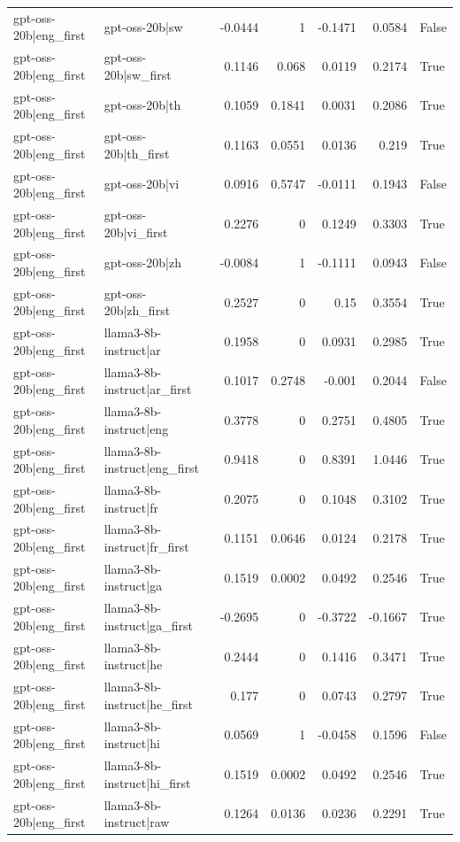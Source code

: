 \begin{table}
\begin{tabular}{l l r r r r l}
gpt-oss-20b|eng_first & gpt-oss-20b|sw & -0.0444 & 1 & -0.1471 & 0.0584 & False \\
gpt-oss-20b|eng_first & gpt-oss-20b|sw_first & 0.1146 & 0.068 & 0.0119 & 0.2174 & True \\
gpt-oss-20b|eng_first & gpt-oss-20b|th & 0.1059 & 0.1841 & 0.0031 & 0.2086 & True \\
gpt-oss-20b|eng_first & gpt-oss-20b|th_first & 0.1163 & 0.0551 & 0.0136 & 0.219 & True \\
gpt-oss-20b|eng_first & gpt-oss-20b|vi & 0.0916 & 0.5747 & -0.0111 & 0.1943 & False \\
gpt-oss-20b|eng_first & gpt-oss-20b|vi_first & 0.2276 & 0 & 0.1249 & 0.3303 & True \\
gpt-oss-20b|eng_first & gpt-oss-20b|zh & -0.0084 & 1 & -0.1111 & 0.0943 & False \\
gpt-oss-20b|eng_first & gpt-oss-20b|zh_first & 0.2527 & 0 & 0.15 & 0.3554 & True \\
gpt-oss-20b|eng_first & llama3-8b-instruct|ar & 0.1958 & 0 & 0.0931 & 0.2985 & True \\
gpt-oss-20b|eng_first & llama3-8b-instruct|ar_first & 0.1017 & 0.2748 & -0.001 & 0.2044 & False \\
gpt-oss-20b|eng_first & llama3-8b-instruct|eng & 0.3778 & 0 & 0.2751 & 0.4805 & True \\
gpt-oss-20b|eng_first & llama3-8b-instruct|eng_first & 0.9418 & 0 & 0.8391 & 1.0446 & True \\
gpt-oss-20b|eng_first & llama3-8b-instruct|fr & 0.2075 & 0 & 0.1048 & 0.3102 & True \\
gpt-oss-20b|eng_first & llama3-8b-instruct|fr_first & 0.1151 & 0.0646 & 0.0124 & 0.2178 & True \\
gpt-oss-20b|eng_first & llama3-8b-instruct|ga & 0.1519 & 0.0002 & 0.0492 & 0.2546 & True \\
gpt-oss-20b|eng_first & llama3-8b-instruct|ga_first & -0.2695 & 0 & -0.3722 & -0.1667 & True \\
gpt-oss-20b|eng_first & llama3-8b-instruct|he & 0.2444 & 0 & 0.1416 & 0.3471 & True \\
gpt-oss-20b|eng_first & llama3-8b-instruct|he_first & 0.177 & 0 & 0.0743 & 0.2797 & True \\
gpt-oss-20b|eng_first & llama3-8b-instruct|hi & 0.0569 & 1 & -0.0458 & 0.1596 & False \\
gpt-oss-20b|eng_first & llama3-8b-instruct|hi_first & 0.1519 & 0.0002 & 0.0492 & 0.2546 & True \\
gpt-oss-20b|eng_first & llama3-8b-instruct|raw & 0.1264 & 0.0136 & 0.0236 & 0.2291 & True \\

\end{tabular}
\end{table}
